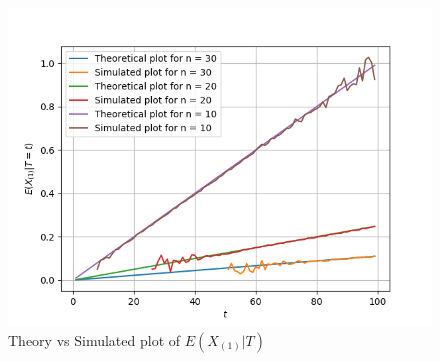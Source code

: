 \documentclass[journal,12pt,twocolumn]{IEEEtran}
\begin{document}
\begin{figure}[!hbt]
    \centering
	\includegraphics[width=\columnwidth]{./Figures/Figure_1.png}
    \caption{Theory vs Simulated plot of $E(X_{(1)} |T)$}
    \label{CDF_Y}
\end{figure}
\end{document}
